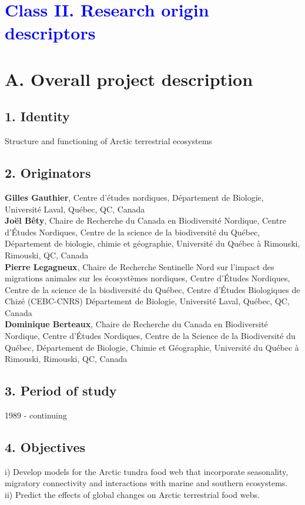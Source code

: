 \documentclass[a4paper,twoside,12pt]{article}
\begin{document}
  \newpage
  
\section*{\textcolor{Blue}{Class II. Research origin descriptors}}
    \section*{A. Overall project description}
    \subsection*{1. Identity} Structure and functioning of Arctic terrestrial ecosystems
        \subsection*{2. Originators}   
        \textbf{Gilles Gauthier}, Centre d’études nordiques, Département de Biologie, Université Laval, Québec, QC, Canada\\
                \textbf{Joël Bêty},  Chaire de Recherche du Canada en Biodiversité Nordique, Centre d’Études Nordiques, Centre de la science de la biodiversité du Québec, Département de biologie, chimie et géographie, Université du Québec à Rimouski, Rimouski, QC, Canada \\
                \textbf{Pierre Legagneux}, Chaire de Recherche Sentinelle Nord sur l’impact des migrations animales sur les écosystèmes nordiques, Centre d’Études Nordiques, Centre de la science de la biodiversité du Québec, Centre d’Études Biologiques de Chizé (CEBC-CNRS) Département de Biologie, Université Laval, Québec, QC, Canada\\
                \textbf{Dominique Berteaux},  Chaire de Recherche du Canada en Biodiversité Nordique, Centre d’Études Nordiques, Centre de la Science de la Biodiversité du Québec, Département de Biologie, Chimie et Géographie, Université du Québec à Rimouski, Rimouski, QC, Canada \\
        
        \subsection*{3. Period of study} 1989 - continuing
        
        \subsection*{4. Objectives}
       i) Develop models for the Arctic tundra food web that incorporate seasonality, migratory connectivity and interactions with marine and southern ecosystems.\\
       ii) Predict the effects of global changes on Arctic terrestrial food webs.
       
\end{document}
